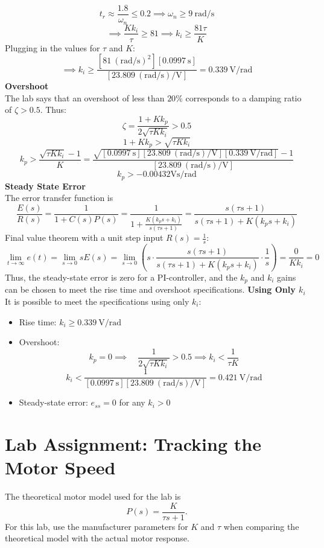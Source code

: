 ﻿\documentclass[12pt]{article}
\begin{document}
\[t_r \approx \frac{1.8}{\omega_n} \leq 0.2 \implies \omega_n \geq 9~\mathrm{rad/s}\]
\[\implies \frac{Kk_i}{\tau} \geq 81 \implies \boxed{k_i \geq \frac{81\tau}{K}}\]
Plugging in the values for $\tau$ and $K$:
\[\implies k_i \geq \frac{[81~\mathrm{(rad/s)^2}][0.0997~\mathrm{s}]}{[23.809~\mathrm{(rad/s)/V}]} = \boxed{0.339~\mathrm{V/rad}}\]
\textbf{Overshoot}\\
The lab says that an overshoot of less than $20\%$ corresponds to a damping ratio of $\zeta > 0.5$. Thus:
\[\zeta  =\frac{1+Kk_p}{2\sqrt{\tau Kk_i}} > 0.5\]
\[1+Kk_p > \sqrt{\tau Kk_i}\]
\[k_p > \frac{\sqrt{\tau Kk_i}-1}{K} = \frac{\sqrt{[0.0997~\mathrm{s}][23.809~\mathrm{(rad/s)/V}][0.339~\mathrm{V/rad}]}-1}{[23.809~\mathrm{(rad/s)/V}]}\]
\[\boxed{k_p > -0.00432\mathrm{Vs/rad}}\]
\textbf{Steady State Error}\\
The error transfer function is
\[\frac{E(s)}{R(s)} = \frac{1}{1+C(s)P(s)}=\frac{1}{1+\frac{K(k_p s+k_i)}{s(\tau s+1)}} = \frac{s(\tau s+1)}{s(\tau s+1)+K(k_p s+k_i)}\]
Final value theorem with a unit step input $R(s) = \frac{1}{s}$:
\[\lim_{t\to\infty} e(t) = \lim_{s\to 0} sE(s) = \lim_{s\to 0} \left(s \cdot \frac{s(\tau s+1)}{s(\tau s+1)+K(k_p s+k_i)} \cdot \frac{1}{s}\right) = \frac{0}{Kk_i} =\boxed{0}\]
Thus, the steady-state error is zero for a PI-controller, and the $k_p$ and $k_i$ gains can be chosen to meet the rise time and overshoot specifications.
\newpage
\textbf{Using Only $k_i$}\\
It is possible to meet the specifications using only $k_i$:
\begin{itemize}
    \item Rise time: $k_i \geq 0.339~\mathrm{V/rad}$
    \item Overshoot: 
    \[k_p = 0 \implies \quad \frac{1}{2\sqrt{\tau Kk_i}} > 0.5 \implies k_i< \frac{1}{\tau K}\]
    \[k_i < \frac{1}{[0.0997~\mathrm{s}][23.809~\mathrm{(rad/s)/V}]} = \boxed{0.421~\mathrm{V/rad}}\]
    \item  Steady-state error: $e_{ss} = 0$ for any $k_i > 0$
\end{itemize}
\section{Lab Assignment: Tracking the Motor Speed}
The theoretical motor model used for the lab is
\[
P(s)=\frac{K}{\tau s+1}.
\]
For this lab, use the manufacturer parameters for $K$ and $\tau$ when comparing the theoretical model with the actual motor response.
\end{document}
